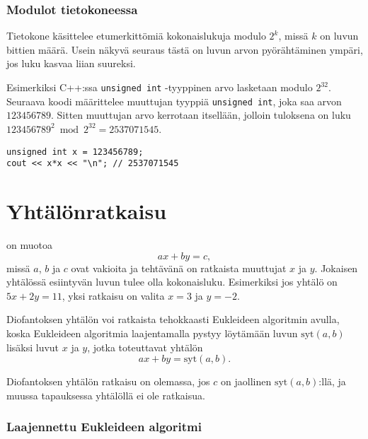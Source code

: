 \subsubsection{Modulot tietokoneessa}

Tietokone käsittelee etumerkittömiä kokonaislukuja
modulo $2^k$, missä $k$ on luvun bittien määrä.
Usein näkyvä seuraus tästä on luvun arvon pyörähtäminen
ympäri, jos luku kasvaa liian suureksi.

Esimerkiksi C++:ssa \texttt{unsigned int} -tyyppinen
arvo lasketaan modulo $2^{32}$.
Seuraava koodi määrittelee muuttujan
tyyppiä \texttt{unsigned int},
joka saa arvon $123456789$.
Sitten muuttujan arvo kerrotaan itsellään,
jolloin tuloksena on luku 
$123456789^2 \bmod 2^{32} = 2537071545$.

\begin{lstlisting}
unsigned int x = 123456789;
cout << x*x << "\n"; // 2537071545
\end{lstlisting}

\section{Yhtälönratkaisu}


 on muotoa
\[ ax + by = c, \]
missä $a$, $b$ ja $c$ ovat vakioita
ja tehtävänä on ratkaista muuttujat $x$ ja $y$.
Jokaisen yhtälössä esiintyvän luvun tulee
olla kokonaisluku.
Esimerkiksi jos yhtälö on $5x+2y=11$, yksi ratkaisu
on valita $x=3$ ja $y=-2$.


Diofantoksen yhtälön voi ratkaista
tehokkaasti Eukleideen algoritmin avulla,
koska Eukleideen algoritmia laajentamalla
pystyy löytämään luvun $\textrm{syt}(a,b)$
lisäksi luvut $x$ ja $y$,
jotka toteuttavat yhtälön
\[
ax + by = \textrm{syt}(a,b).
\]

Diofantoksen yhtälön ratkaisu on olemassa, jos $c$ on
jaollinen $\textrm{syt}(a,b)$:llä,
ja muussa tapauksessa yhtälöllä ei ole ratkaisua.


\subsubsection*{Laajennettu Eukleideen algoritmi}

